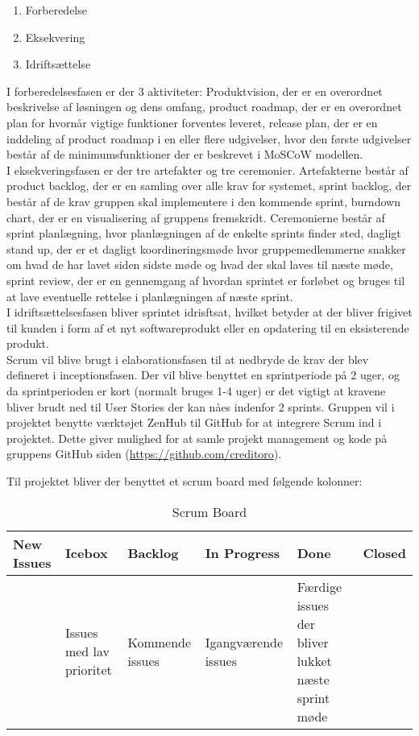 \begin{enumerate}
    \item Forberedelse
    \item Eksekvering
    \item Idriftsættelse
\end{enumerate}


I forberedelsesfasen er der 3 aktiviteter: Produktvision, der er en overordnet beskrivelse af løsningen og dens omfang, product roadmap, der er en overordnet plan for hvornår vigtige funktioner forventes leveret, release plan, der er en inddeling af product roadmap i en eller flere udgivelser, hvor den første udgivelser består af de minimumsfunktioner der er beskrevet i MoSCoW modellen.\\


I eksekveringsfasen er der tre artefakter og tre ceremonier. Artefakterne består af product backlog, der er en samling over alle krav for systemet, sprint backlog, der består af de krav gruppen skal implementere i den kommende sprint, burndown chart, der er en visualisering af gruppens fremskridt. Ceremonierne består af sprint planlægning, hvor planlægningen af de enkelte sprints finder sted, dagligt stand up, der er et dagligt koordineringsmøde hvor gruppemedlemmerne snakker om hvad de har lavet siden sidste møde og hvad der skal laves til næste møde, sprint review, der er en gennemgang af hvordan sprintet er forløbet og bruges til at lave eventuelle rettelse i planlægningen af næste sprint. \\


I idriftsættelsesfasen bliver sprintet idrisftsat, hvilket betyder at der bliver frigivet til kunden i form af et nyt softwareprodukt eller en opdatering til en eksisterende produkt.\\


Scrum vil blive brugt i elaborationsfasen til at nedbryde de krav der blev defineret i inceptionsfasen. Der vil blive benyttet en sprintperiode på 2 uger, og da sprintperioden er kort (normalt bruges 1-4 uger) er det vigtigt at kravene bliver brudt ned til User Stories der kan nåes indenfor 2 sprints.
Gruppen vil i projektet benytte værktøjet ZenHub til GitHub for at integrere Scrum ind i projektet. Dette giver mulighed for at samle projekt management og kode på gruppens GitHub siden (\url{https://github.com/creditoro}).

Til projektet bliver der benyttet et scrum board med følgende kolonner:\\

\begin{table}[ht]
    \begin{tabularx}{\textwidth}{|X|X|X|X|X|X|}
    \hline
    \textbf{New Issues} & \textbf{Icebox} & \textbf{Backlog} & \textbf{In Progress} & \textbf{Done} & \textbf{Closed} \\ \hline
     & Issues med lav prioritet & Kommende issues & Igangværende issues & Færdige issues der bliver lukket næste sprint møde & \\ \hline
    \end{tabularx}
    \caption{Scrum Board}
    \label{tab:scrumboard}
\end{table} 

